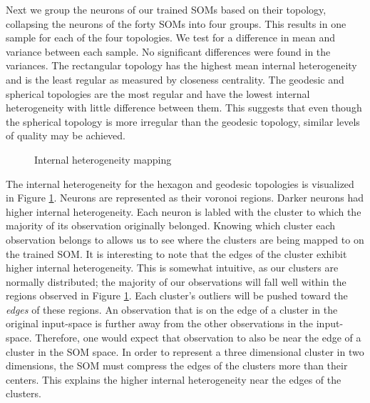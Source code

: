 Next we group the neurons of our trained SOMs based on their topology,
collapsing the neurons of the forty SOMs into four groups.  This results in one
sample for each of the four topologies.  We test for a difference in mean and
variance between each sample. No significant differences were found in the
variances.  The rectangular topology has the highest mean internal heterogeneity
and is the least regular as measured by closeness centrality. The geodesic and
spherical topologies are the most regular and have the lowest internal
heterogeneity with little difference between them.  This suggests that even
though the spherical topology is more irregular than the geodesic topology,
similar levels of quality may be achieved. 

\begin{figure}[htbp]
\centering
\caption{Internal heterogeneity mapping}
\label{cluster}
\end{figure}

The internal heterogeneity for the hexagon and geodesic topologies is visualized
in Figure \ref{cluster}.  Neurons are represented as their voronoi regions.
Darker neurons had higher internal heterogeneity.  Each neuron is labled with
the cluster to which the majority of its observation originally belonged. Knowing
which cluster each observation belongs to allows us to see where the clusters
are being mapped to on the trained SOM. It is interesting to note that the
edges of the cluster exhibit higher internal heterogeneity.  This is somewhat
intuitive, as our clusters are normally distributed; the majority of our
observations will fall well within the regions observed in Figure
\ref{cluster}. Each cluster's outliers will be pushed toward the \emph{edges}
of these regions. An observation that is on the edge of a cluster in the
original input-space is further away from the other observations in the
input-space.  Therefore, one would expect that observation to also be near the
edge of a cluster in the SOM space.  In order to represent a three dimensional
cluster in two dimensions, the SOM must compress the edges of the clusters
more than their centers.  This explains the higher internal heterogeneity near
the edges of the clusters.



